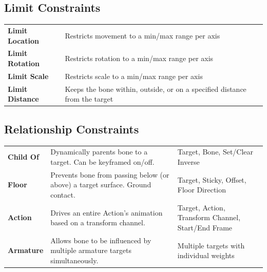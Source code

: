 \subsection{Limit Constraints}

\begin{center}
\begin{tabularx}{\textwidth}{L{3cm}X}
\toprule
{}
 &  \\
\midrule
\textbf{Limit Location} & Restricts movement to a min/max range per axis \\
\textbf{Limit Rotation} & Restricts rotation to a min/max range per axis \\
\textbf{Limit Scale} & Restricts scale to a min/max range per axis \\
\textbf{Limit Distance} & Keeps the bone within, outside, or on a specified distance from the target \\
\bottomrule
\end{tabularx}
\end{center}

\subsection{Relationship Constraints}

\begin{center}
\begin{tabularx}{\textwidth}{L{2.5cm}L{4cm}X}
\toprule
{}
 &  &  \\
\midrule
\textbf{Child Of} & Dynamically parents bone to a target. Can be keyframed on/off. & Target, Bone, Set/Clear Inverse \\
\textbf{Floor} & Prevents bone from passing below (or above) a target surface. Ground contact. & Target, Sticky, Offset, Floor Direction \\
\textbf{Action} & Drives an entire Action's animation based on a transform channel. & Target, Action, Transform Channel, Start/End Frame \\
\textbf{Armature} & Allows bone to be influenced by multiple armature targets simultaneously. & Multiple targets with individual weights \\
\bottomrule
\end{tabularx}
\end{center}

